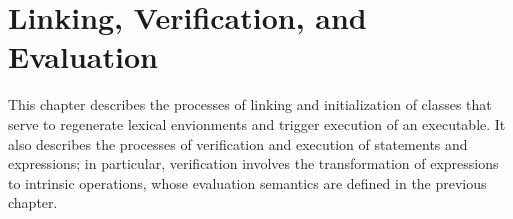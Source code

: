 \makeatletter{}\documentclass[10pt,oneside]{book}
\theoremstyle{note}
\newcommand{\nsval}{{\sf nsval}}
\newcommand{\id}{{\sf id}}
\begin{document}





 

\chapter{Linking, Verification, and Evaluation}\label{chap:evaluation}

\makeatletter{}%

This chapter describes the processes of linking and initialization of
classes that serve to regenerate lexical envionments and trigger
execution of an executable. It also describes the
processes of verification and execution of statements
and expressions; in particular, verification involves the transformation of expressions to
intrinsic operations, whose evaluation semantics are defined in the previous chapter.
\end{document}
